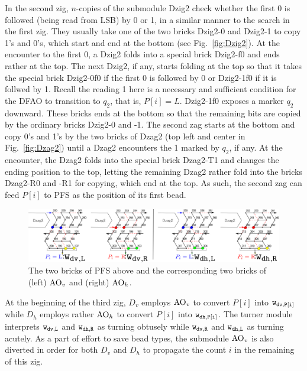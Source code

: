 \documentclass[runningheads]{llncs}
\begin{document}
In the second zig, $n$-copies of the submodule Dzig2 check whether the first 0 is followed (being read from LSB) by 0 or 1, in a similar manner to the search in the first zig. 
They usually take one of the two bricks Dzig2-0 and Dzig2-1 to copy 1's and 0's, which start and end at the bottom (see Fig.~\ref{fig:Dzig2}).
At the encounter to the first 0, a Dzig2 folds into a special brick Dzig2-f0 and ends rather at the top. 
The next Dzig2, if any, starts folding at the top so that it takes the special brick Dzig2-0f0 if the first 0 is followed by 0 or Dzig2-1f0 if it is follwed by 1. 
Recall the reading 1 here is a necessary and sufficient condition for the DFAO to transition to $q_2$, that is, $P[i] = L$. 
Dzig2-1f0 exposes a marker $q_2$ downward. 
These bricks ends at the bottom so that the remaining bits are copied by the ordinary bricks Dzig2-0 and -1. 
The second zag starts at the bottom and copy 0's and 1's by the two bricks of Dzag2 (top left and center in Fig.~\ref{fig:Dzag2}) until a Dzag2 encounters the 1 marked by $q_2$, if any. 
At the encounter, the Dzag2 folds into the special brick Dzag2-T1 and changes the ending position to the top, letting the remaining Dzag2 rather fold into the bricks Dzag2-R0 and -R1 for copying, which end at the top. 
As such, the second zag can feed $P[i]$ to PFS as the position of its first bead. 

\begin{figure}[tb]
\centering
\includegraphics[width=\linewidth]{Figs/PFS.png}
\caption{The two bricks of PFS above and the corresponding two bricks of (left) ${\rm AO}_v$ and (right) ${\rm AO}_h$.}
\label{fig:PFS}
\end{figure}


At the beginning of the third zig, $D_v$ employs ${\rm AO}_v$ to convert $P[i]$ into ${\tt w_{dv, P[i]}}$ while $D_h$ employs rather ${\rm AO}_h$ to convert $P[i]$ into ${\tt w_{dh, P[i]}}$. 
The turner module interprets ${\tt w_{dv, L}}$ and ${\tt w_{dh, R}}$ as turning obtusely while ${\tt w_{dv, R}}$ and ${\tt w_{dh, L}}$ as turning acutely. 
As a part of effort to save bead types, the submodule ${\rm AO}_v$ is also diverted in order for both $D_v$ and $D_h$ to propagate the count $i$ in the remaining of this zig. 
\end{document}

